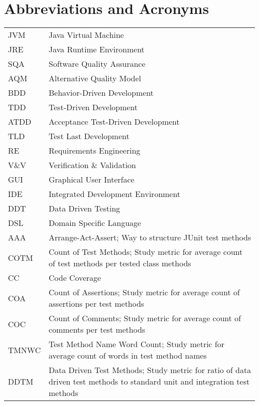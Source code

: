 \chapter*{Abbreviations and Acronyms}


\noindent
\begin{longtable}{@{}p{}p{}@{}}
JVM & Java Virtual Machine \\
JRE & Java Runtime Environment \\
SQA & Software Quality Assurance \\
AQM & Alternative Quality Model \\
BDD & Behavior-Driven Development \\
TDD & Test-Driven Development \\
ATDD & Acceptance Test-Driven Development \\
TLD & Test Last Development \\
RE & Requirements Engineering \\
V\&V & Verification \& Validation \\
GUI & Graphical User Interface \\
IDE & Integrated Development Environment \\
DDT & Data Driven Testing \\
DSL & Domain Specific Language \\
AAA & Arrange-Act-Assert; Way to structure JUnit test methods \\
COTM & Count of Test Methods; Study metric for average count of test methods per tested class methods \\
CC & Code Coverage \\
COA & Count of Assertions; Study metric for average count of assertions per test methods \\
COC & Count of Comments; Study metric for average count of comments per test methods \\
TMNWC & Test Method Name Word Count; Study metric for average count of words in test method names \\
DDTM & Data Driven Test Methods; Study metric for ratio of data driven test methods to standard unit and integration test methods \\
\end{longtable}
